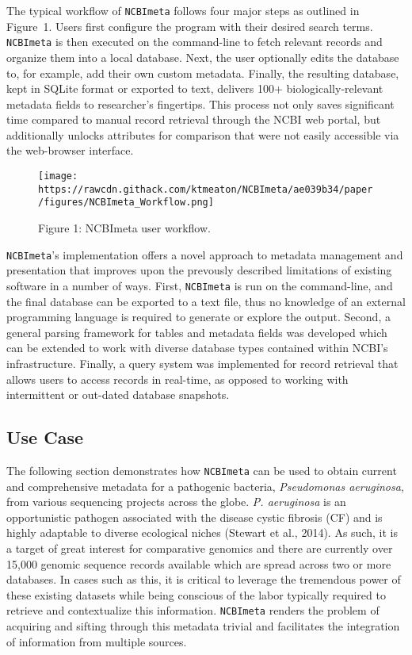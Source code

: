 \documentclass[
]{article}
\begin{document}
The typical workflow of \texttt{NCBImeta} follows four major steps as
outlined in Figure~1. Users first configure the program with their
desired search terms. \texttt{NCBImeta} is then executed on the
command-line to fetch relevant records and organize them into a local
database. Next, the user optionally edits the database to, for example,
add their own custom metadata. Finally, the resulting database, kept in
SQLite format or exported to text, delivers 100+ biologically-relevant
metadata fields to researcher's fingertips. This process not only saves
significant time compared to manual record retrieval through the NCBI
web portal, but additionally unlocks attributes for comparison that were
not easily accessible via the web-browser interface.

\begin{figure}
\hypertarget{fig:NCBImeta_Workflow}{%
\centering
\texttt{[image: https://rawcdn.githack.com/ktmeaton/NCBImeta/ae039b34/paper/figures/NCBImeta\_Workflow.png]}
\caption{Figure 1: NCBImeta user workflow.}\label{fig:NCBImeta_Workflow}
}
\end{figure}

\texttt{NCBImeta}'s implementation offers a novel approach to metadata
management and presentation that improves upon the prevously described
limitations of existing software in a number of ways. First,
\texttt{NCBImeta} is run on the command-line, and the final database can
be exported to a text file, thus no knowledge of an external programming
language is required to generate or explore the output. Second, a
general parsing framework for tables and metadata fields was developed
which can be extended to work with diverse database types contained
within NCBI's infrastructure. Finally, a query system was implemented
for record retrieval that allows users to access records in real-time,
as opposed to working with intermittent or out-dated database snapshots.

\hypertarget{sec:use-case}{%
\subsection{Use Case}\label{sec:use-case}}

The following section demonstrates how \texttt{NCBImeta} can be used to
obtain current and comprehensive metadata for a pathogenic bacteria,
\emph{Pseudomonas aeruginosa}, from various sequencing projects across
the globe. \emph{P. aeruginosa} is an opportunistic pathogen associated
with the disease cystic fibrosis (CF) and is highly adaptable to diverse
ecological niches (Stewart et al., 2014). As such, it is a target of
great interest for comparative genomics and there are currently over
15,000 genomic sequence records available which are spread across two or
more databases. In cases such as this, it is critical to leverage the
tremendous power of these existing datasets while being conscious of the
labor typically required to retrieve and contextualize this information.
\texttt{NCBImeta} renders the problem of acquiring and sifting through
this metadata trivial and facilitates the integration of information
from multiple sources.
\end{document}
